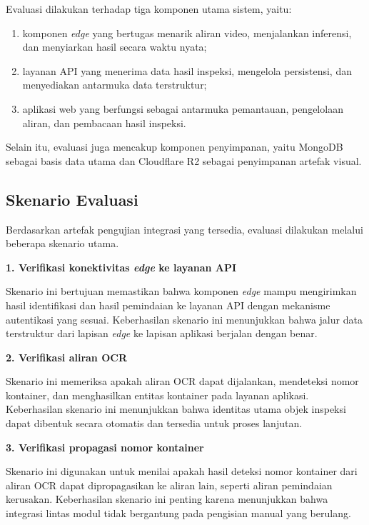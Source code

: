 Evaluasi dilakukan terhadap tiga komponen utama sistem, yaitu:
\begin{enumerate}
    \item komponen \textit{edge} yang bertugas menarik aliran video, menjalankan
    inferensi, dan menyiarkan hasil secara waktu nyata;
    \item layanan API yang menerima data hasil inspeksi, mengelola persistensi,
    dan menyediakan antarmuka data terstruktur;
    \item aplikasi web yang berfungsi sebagai antarmuka pemantauan,
    pengelolaan aliran, dan pembacaan hasil inspeksi.
\end{enumerate}

Selain itu, evaluasi juga mencakup komponen penyimpanan, yaitu MongoDB sebagai
basis data utama dan Cloudflare R2 sebagai penyimpanan artefak visual.

\subsection{Skenario Evaluasi}
\label{subsec:skenario-evaluasi}

Berdasarkan artefak pengujian integrasi yang tersedia, evaluasi dilakukan
melalui beberapa skenario utama.

\textbf{1. Verifikasi konektivitas \textit{edge} ke layanan API}

Skenario ini bertujuan memastikan bahwa komponen \textit{edge} mampu
mengirimkan hasil identifikasi dan hasil pemindaian ke layanan API dengan
mekanisme autentikasi yang sesuai. Keberhasilan skenario ini menunjukkan bahwa
jalur data terstruktur dari lapisan \textit{edge} ke lapisan aplikasi berjalan
dengan benar.

\textbf{2. Verifikasi aliran OCR}

Skenario ini memeriksa apakah aliran OCR dapat dijalankan, mendeteksi nomor
kontainer, dan menghasilkan entitas kontainer pada layanan aplikasi.
Keberhasilan skenario ini menunjukkan bahwa identitas utama objek inspeksi dapat
dibentuk secara otomatis dan tersedia untuk proses lanjutan.

\textbf{3. Verifikasi propagasi nomor kontainer}

Skenario ini digunakan untuk menilai apakah hasil deteksi nomor kontainer dari
aliran OCR dapat dipropagasikan ke aliran lain, seperti aliran pemindaian
kerusakan. Keberhasilan skenario ini penting karena menunjukkan bahwa integrasi
lintas modul tidak bergantung pada pengisian manual yang berulang.

